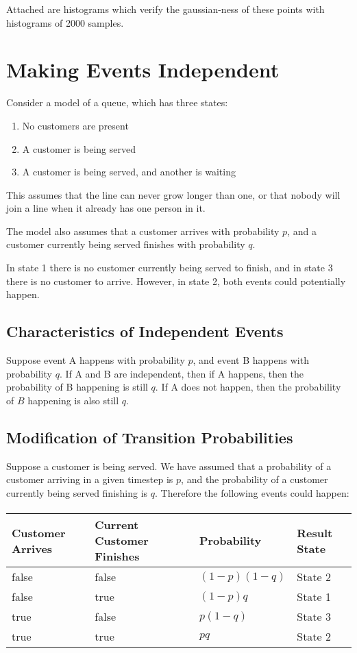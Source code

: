 \documentclass{article}
\begin{document}
Attached are histograms which verify the gaussian-ness of these points
	with histograms of 2000 samples.

\section{Making Events Independent}

Consider a model of a queue, which has three states:

\begin{enumerate}
\item No customers are present
\item A customer is being served
\item A customer is being served, and another is waiting
\end{enumerate}

This assumes that the line can never grow longer than one, or that
	nobody will join a line when it already has one person in it.

The model also assumes that a customer arrives with probability $p$,
	and a customer currently being served finishes with probability $q$.

In state 1 there is no customer currently being served to finish,
	and in state 3 there is no customer to arrive.
However, in state 2, both events could potentially happen.

\subsection{Characteristics of Independent Events}

Suppose event A happens with probability $p$, and event B happens with
	probability $q$.
If A and B are independent, then if A happens, then the probability of 
	B happening is still $q$.
If A does not happen, then the probability of $B$ happening is also still $q$.

\subsection{Modification of Transition Probabilities}

Suppose a customer is being served.
We have assumed that a probability of a customer arriving in a given timestep is  $p$, 
	and the probability of a customer currently being served finishing is $q$.
Therefore the following events could happen:

\paragraph{}
\begin{tabular}{l | l | l | l }
Customer Arrives & Current Customer Finishes & Probability & Result State\\
\hline
false & false & $(1 - p) (1 - q)$ & State 2\\
false & true  & $(1 - p) q $ & State 1\\
true & false & $p (1 - q)$ & State 3\\
true & true & $p q$ & State 2 \\
\end{tabular}
\end{document}
